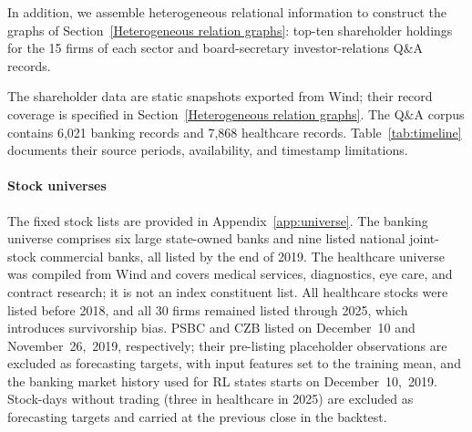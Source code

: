 In addition, we assemble heterogeneous relational information to construct the graphs of Section~\ref{Heterogeneous relation graphs}: top-ten shareholder holdings for the 15 firms of each sector and board-secretary investor-relations Q\&A records.
{\color{blue}
The shareholder data are static snapshots exported from Wind; their record coverage is specified in Section~\ref{Heterogeneous relation graphs}. The Q\&A corpus contains 6{,}021 banking records and 7{,}868 healthcare records. Table~\ref{tab:timeline} documents their source periods, availability, and timestamp limitations.
\par}

\paragraph{Stock universes}
{\color{blue}
The fixed stock lists are provided in Appendix~\ref{app:universe}. The banking universe comprises six large state-owned banks and nine listed national joint-stock commercial banks, all listed by the end of 2019. The healthcare universe was compiled from Wind and covers medical services, diagnostics, eye care, and contract research; it is not an index constituent list. All healthcare stocks were listed before 2018, and all 30 firms remained listed through 2025, which introduces survivorship bias. PSBC and CZB listed on December~10 and November~26,~2019, respectively; their pre-listing placeholder observations are excluded as forecasting targets, with input features set to the training mean, and the banking market history used for RL states starts on December~10,~2019. Stock-days without trading (three in healthcare in 2025) are excluded as forecasting targets and carried at the previous close in the backtest.
\par}

